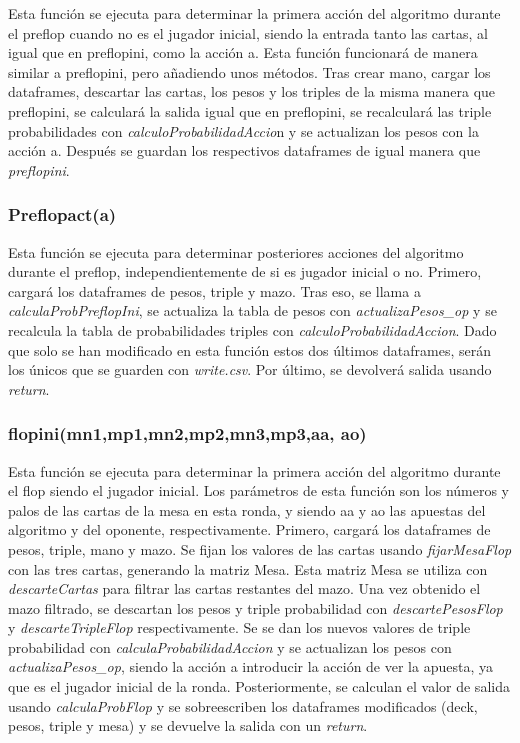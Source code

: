 Esta función se ejecuta para determinar la primera acción del algoritmo durante el preflop cuando no es el jugador inicial, siendo la entrada tanto las cartas, al igual que en preflopini, como la acción a. Esta función funcionará de manera similar a preflopini, pero añadiendo unos métodos.
Tras crear mano, cargar los dataframes, descartar las cartas, los pesos y los triples de la misma manera que preflopini, se calculará la salida igual que en preflopini, se recalculará las triple probabilidades con \textit{calculoProbabilidadAccio}n y  se actualizan los pesos con la acción a.
Después se guardan los respectivos dataframes de igual manera que \textit{preflopini}.


\subsubsection{Preflopact(a)}

Esta función se ejecuta para determinar posteriores acciones del algoritmo durante el preflop, independientemente de si es jugador inicial o no.
Primero, cargará los dataframes de pesos, triple y mazo. Tras eso, se llama a \textit{calculaProbPreflopIni}, se actualiza la tabla de pesos con\textit{ actualizaPesos\_op} y se recalcula la tabla de probabilidades triples con\textit{ calculoProbabilidadAccion}. Dado que solo se han modificado en esta función estos dos últimos dataframes, serán los únicos que se guarden con \textit{write.csv}.
Por último, se devolverá  salida usando \textit{return}.


\subsubsection{flopini(mn1,mp1,mn2,mp2,mn3,mp3,aa, ao)}

Esta función se ejecuta para determinar la primera acción del algoritmo durante el flop siendo el jugador inicial. Los parámetros de esta función son los números y palos de las cartas de la mesa en esta ronda, y siendo aa y ao las apuestas del algoritmo y del oponente, respectivamente. 
Primero, cargará los dataframes de pesos, triple, mano y mazo. Se fijan los valores de las cartas usando \textit{fijarMesaFlop} con las tres cartas, generando la matriz Mesa. Esta matriz Mesa se utiliza con  \textit{descarteCartas} para filtrar las cartas restantes del mazo. 
Una vez obtenido el mazo filtrado, se descartan los pesos y triple probabilidad con \textit{descartePesosFlop} y \textit{descarteTripleFlop} respectivamente. Se se dan los nuevos valores de triple probabilidad con \textit{calculaProbabilidadAccion} y se  actualizan los pesos con \textit{actualizaPesos\_op}, siendo la acción a introducir la acción de ver la apuesta, ya que es el jugador inicial de la ronda.
Posteriormente, se calculan el valor de salida usando  \textit{calculaProbFlop} y se sobreescriben los dataframes modificados (deck, pesos, triple y mesa) y se devuelve la salida con un  \textit{return}.

